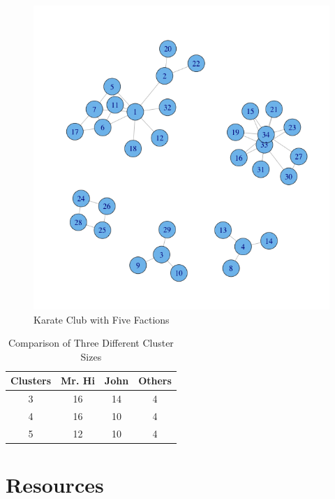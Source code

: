 \documentclass{article}
\begin{document}
\begin{figure}[H]
\centering
\includegraphics[scale=0.50]{ec/karateclub5}
\caption{Karate Club with Five Factions}
\label{after5}
\end{figure}

\begin{table}[!h]
\centering

\begin{tabular}{c c c c}
\hline
Clusters & Mr. Hi &  John & Others \\
\hline
\hline
3 & 16 & 14 & 4  \\
4 & 16 & 10 & 4  \\
5 & 12 & 10 & 4  \\
\hline
\end{tabular}
\caption{Comparison of Three Different Cluster Sizes}
\label{compares}
\end{table}


\newpage

\section*{Resources}
\end{document}
